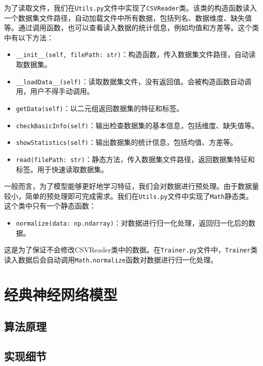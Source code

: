 \documentclass[10pt,a4paper,twoside]{article}
\numberwithin{figure}{section}%
\numberwithin{table}{section}%
\begin{document}
为了读取文件，我们在\texttt{Utils.py}文件中实现了\texttt{CSVReader}类。该类的构造函数读入一个数据集文件路径，自动加载文件中所有数据，包括列名、数据维度、缺失值等。通过调用函数，也可以查看读入数据的统计信息，例如均值和方差等。这个类中有以下方法：

\begin{itemize}
	\item \texttt{\_\_init\_\_(self, filePath: str)}：构造函数，传入数据集文件路径，自动读取数据集。
	\item \texttt{\_\_loadData\_\_(self)}：读取数据集文件，没有返回值。会被构造函数自动调用，用户不得手动调用。
	\item \texttt{getData(self)}：以二元组返回数据集的特征和标签。
	\item \texttt{checkBasicInfo(self)}：输出检查数据集的基本信息，包括维度、缺失值等。
	\item \texttt{showStatistics(self)}：输出数据集的统计信息，包括均值、方差等。
	\item \texttt{read(filePath: str)}：静态方法，传入数据集文件路径，返回数据集特征和标签。用于快速读取数据集。
\end{itemize}

一般而言，为了模型能够更好地学习特征，我们会对数据进行预处理。由于数据量较小，简单的预处理即可完成需求。我们在\texttt{Utils.py}文件中实现了\texttt{Math}静态类。这个类中只有一个静态函数：

\begin{itemize}
	\item \texttt{normalize(data: np.ndarray)}：对数据进行归一化处理，返回归一化后的数据。
\end{itemize}

这是为了保证不会修改CSVReader类中的数据。在\texttt{Trainer.py}文件中，\texttt{Trainer}类读入数据后会自动调用\texttt{Math.normalize}函数对数据进行归一化处理。


\section{经典神经网络模型}

\subsection{算法原理}

\subsection{实现细节}
\end{document}

